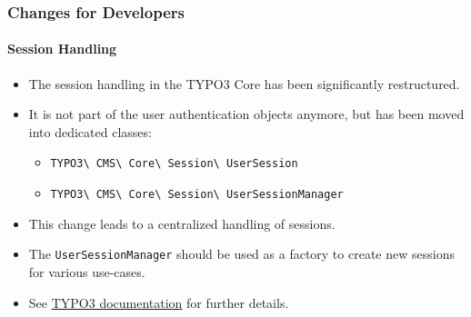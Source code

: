 %

\begin{frame}[fragile]
	\frametitle{Changes for Developers}
	\framesubtitle{Session Handling}

	\lstset{basicstyle=\tiny\ttfamily}

	\begin{itemize}
		\item The session handling in the TYPO3 Core has been significantly restructured.
		\item It is not part of the user authentication objects anymore,
			but has been moved into dedicated classes:

			\begin{itemize}\small
				\item \texttt{TYPO3\textbackslash
					CMS\textbackslash
					Core\textbackslash
					Session\textbackslash
					UserSession}
				\item \texttt{TYPO3\textbackslash
					CMS\textbackslash
					Core\textbackslash
					Session\textbackslash
					UserSessionManager}
			\end{itemize}

		\item This change leads to a centralized handling of sessions.
		\item The \texttt{UserSessionManager} should be used as a factory to
			create new sessions for various use-cases.
		\item See
			\href{https://docs.typo3.org/m/typo3/reference-coreapi/master/en-us/ApiOverview/SessionStorageFramework/Index.html}{TYPO3 documentation}
			for further details.
	\end{itemize}

\end{frame}

